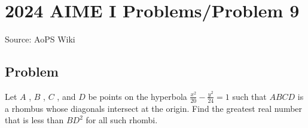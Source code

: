 \documentclass[12pt]{article}
\begin{document}
\section*{{2024 AIME I Problems/Problem 9}}
Source: AoPS Wiki

\subsection*{Problem}
Let $A$ , $B$ , $C$ , and $D$ be points on the hyperbola $\frac{x^2}{20}- \frac{y^2}{24} = 1$ such that $ABCD$ is a rhombus whose diagonals intersect at the origin. Find the greatest real number that is less than $BD^2$ for all such rhombi.
\end{document}
